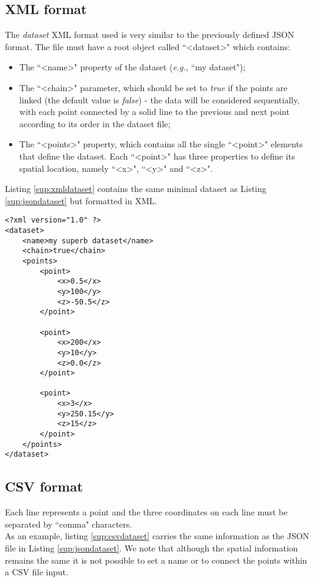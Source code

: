 		\subsection{XML format}
The {\it{dataset}} XML format used is very similar to the previously defined JSON format. The file must have a root object called ``\textless dataset\textgreater " which contains: \begin{itemize}
\item{The ``\textless name\textgreater " property of the dataset (\textit{e.g.}, ``my dataset");}
\item{The ``\textless chain\textgreater " parameter, which should be set to \textit{true} if the points are linked (the default value is \textit{false}) - the data will be considered sequentially, with each point connected by a solid line to the previous and next point according to its order in the dataset file;}
\item{The ``\textless points\textgreater " property, which contains all the single ``\textless point\textgreater " elements that define the dataset. Each ``\textless point\textgreater " has three properties to define its spatial location, namely ``\textless x\textgreater ", ``\textless y\textgreater " and ``\textless z\textgreater ".}
\end{itemize}

Listing \ref{sup:xmldataset} contains the same minimal dataset as Listing \ref{sup:jsondataset} but formatted in XML.

\begin{lstlisting}[float,caption=XML dataset file,label=sup:xmldataset]
<?xml version="1.0" ?>
<dataset>
	<name>my superb dataset</name>	
	<chain>true</chain>
	<points>
		<point>
			<x>0.5</x>
			<y>100</y>
			<z>-50.5</z>
		</point>

		<point>
			<x>200</x>
			<y>10</y>
			<z>0.0</z>
		</point>

		<point>
			<x>3</x>
			<y>250.15</y>
			<z>15</z>
		</point>
	</points>
</dataset>

\end{lstlisting}

		\subsection{CSV format}
Each line represents a point and the three coordinates on each line must be separated by ``comma" characters.\\
As an example, listing \ref{sup:csvdataset} carries the same information as the JSON file in Listing \ref{sup:jsondataset}. We note that although the spatial information remains the same it is not possible to set a name or to connect the points within a CSV file input.

